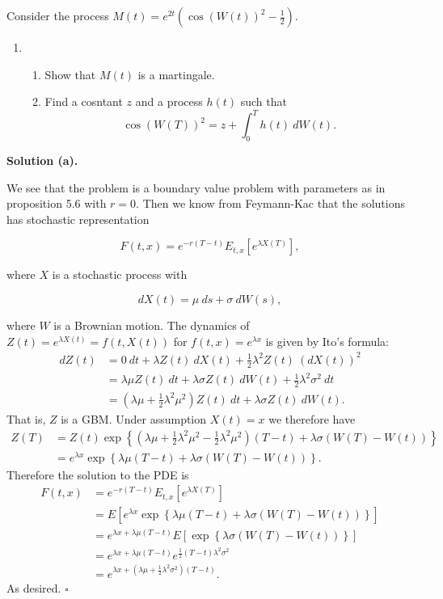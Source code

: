 \documentclass[a4paper,12pt,openany]{book}
\providecommand{\tightlist}{%
 \setlength{\itemsep}{0pt}\setlength{\parskip}{0pt}}
\begin{document}
Consider the process \(M(t)=e^{2t}\left(\cos(W(t))^2-\frac{1}{2}\right)\).

\begin{enumerate}
\def\labelenumi{\alph{enumi}.}
\setcounter{enumi}{2}
\item
  \begin{enumerate}
  \def\labelenumii{\roman{enumii}.}
  \tightlist
  \item
    Show that \(M(t)\) is a martingale.
  \item
    Find a cosntant \(z\) and a process \(h(t)\) such that
    \[
    \cos(W(T))^2=z+\int_0^T h(t)\ dW(t).
    \]
  \end{enumerate}
\end{enumerate}

\noindent\makebox[\linewidth]{\rule{\textwidth}{0.4pt}}

\textbf{Solution (a).}

We see that the problem is a boundary value problem with parameters as in proposition 5.6 with \(r=0\). Then we know from Feymann-Kac that the solutions has stochastic representation

\[
F(t,x)=e^{-r(T-t)}E_{t,x}[e^{\lambda X(T)}],
\]

where \(X\) is a stochastic process with

\[
dX(t)=\mu\ ds+\sigma\ dW(s),
\]

where \(W\) is a Brownian motion. The dynamics of \(Z(t)=e^{\lambda X(t)}=f(t,X(t))\) for \(f(t,x)=e^{\lambda x}\) is given by Ito's formula:
\begin{align*}
dZ(t)&=0\ dt+\lambda Z(t)\ dX(t)+\frac{1}{2}\lambda^2Z(t)\ (dX(t))^2\\
&=\lambda \mu Z(t)\ dt + \lambda \sigma Z(t)\ dW(t)+\frac{1}{2}\lambda^2\sigma^2\ dt\\
&=\left(\lambda\mu+\frac{1}{2}\lambda^2\mu^2\right)Z(t)\ dt + \lambda\sigma Z(t)\ dW(t).
\end{align*}
That is, \(Z\) is a GBM. Under assumption \(X(t)=x\) we therefore have
\begin{align*}
Z(T)&=Z(t)\exp\left\{\left(\lambda\mu+\frac{1}{2}\lambda^2\mu^2-\frac{1}{2}\lambda^2\mu^2\right)(T-t)+\lambda \sigma(W(T)-W(t))\right\}\\
&=e^{\lambda x}\exp\left\{\lambda\mu(T-t)+\lambda \sigma(W(T)-W(t))\right\}.
\end{align*}
Therefore the solution to the PDE is
\begin{align*}
F(t,x)&=e^{-r(T-t)}E_{t,x}[e^{\lambda X(T)}]\\
&=E\left[e^{\lambda x}\exp\left\{\lambda\mu(T-t)+\lambda \sigma(W(T)-W(t))\right\}\right]\\
&=e^{\lambda x+\lambda\mu(T-t)}E\left[\exp\left\{\lambda \sigma(W(T)-W(t))\right\}\right]\\
&=e^{\lambda x+\lambda\mu(T-t)}e^{\frac{1}{2}(T-t)\lambda^2\sigma^2}\\
&=e^{\lambda x+\left(\lambda\mu+\frac{1}{2}\lambda^2\sigma^2\right)(T-t)}.
\end{align*}
As desired. \(\square\)
\end{document}
